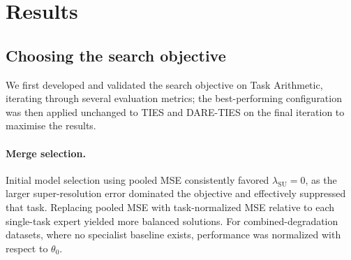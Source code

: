 \documentclass{article}
\begin{document}
\section{Results}
\label{sec:results}

\subsection{Choosing the search objective}

We first developed and validated the search objective on Task Arithmetic, iterating through several evaluation metrics; the best-performing configuration was then applied unchanged to TIES and DARE-TIES on the final iteration to maximise the results.

%

\paragraph*{Merge selection.} Initial model selection using pooled MSE consistently favored $\lambda_{\mathrm{SU}}=0$, as the larger super-resolution error dominated the objective and effectively suppressed that task. Replacing pooled MSE with task-normalized MSE relative to each single-task expert yielded more balanced solutions. For combined-degradation datasets, where no specialist baseline exists, performance was normalized with respect to $\theta_0$.
\end{document}
